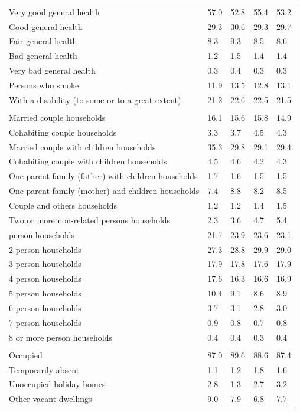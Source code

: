 \documentclass{article}
\begin{document}
\begin{table}[h]
\begin{tabular}{KTTTT}
    \hline
Very good general health & 57.0& 52.8&55.4& 53.2\\
Good general health & 29.3& 30.6& 29.3& 29.7\\
Fair general health & 8.3& 9.3&8.5& 8.6\\
Bad general health & 1.2& 1.5&1.4& 1.4\\
Very bad general health & 0.3& 0.4&0.3& 0.3\\
    \hline
Persons who smoke & 11.9& 13.5&12.8& 13.1\\
    \hline
With a disability (to some or to a great extent) & 21.2& 22.6&22.5& 21.5\\
\hline
    \\ 
    \hline
Married couple households & 16.1& 15.6& 15.8& 14.9\\
Cohabiting couple households & 3.3& 3.7& 4.5& 4.3\\
Married couple with children households & 35.3& 29.8& 29.1& 29.4\\
Cohabiting couple with children households & 4.5& 4.6& 4.2& 4.3\\
One parent family (father) with  children households & 1.7& 1.6& 1.5& 1.5\\
One parent family (mother) and children households & 7.4& 8.8& 8.2& 8.5\\
Couple and others households  & 1.2& 1.2& 1.4& 1.5\\
Two or more non-related persons households & 2.3& 3.6& 4.7& 5.4\\
     person households & 21.7& 23.9& 23.6& 23.1\\
2 person households & 27.3& 28.8& 29.9& 29.0\\
3 person households & 17.9& 17.8& 17.6& 17.9\\
4 person households & 17.6& 16.3& 16.6& 16.9\\
5 person households & 10.4&  9.1&  8.6&  8.9\\
6 person households & 3.7& 3.1& 2.8& 3.0\\
7 person households & 0.9& 0.8& 0.7& 0.8\\
8 or more person households & 0.4& 0.4& 0.3& 0.4\\
\hline
    \\ 
    \hline
Occupied & 87.0& 89.6& 88.6& 87.4\\
Temporarily absent & 1.1& 1.2& 1.8& 1.6\\
Unoccupied holiday homes & 2.8& 1.3& 2.7& 3.2\\
Other vacant dwellings & 9.0& 7.9& 6.8& 7.7\\
\hline
\end{tabular}
\end{table}
\end{document}
